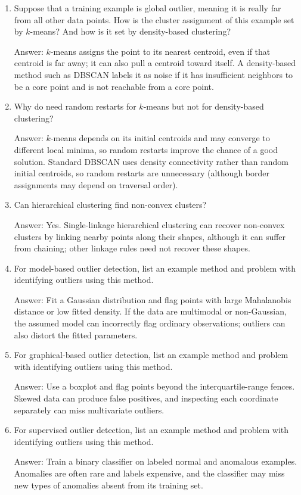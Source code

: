 \documentclass{article}
\newcommand{\gre}[1]{\textcolor{gre}{#1}}
\newcommand\ans[1]{\par\gre{Answer: #1}}
\begin{document}
\begin{enumerate}
\item Suppose that a training example is global outlier, meaning it is really far from all other data points. How is the cluster assignment of this example set by $k$-means? And how is it set by density-based clustering?
\ans{$k$-means assigns the point to its nearest centroid, even if that centroid is far away; it can also pull a centroid toward itself. A density-based method such as DBSCAN labels it as noise if it has insufficient neighbors to be a core point and is not reachable from a core point.}

\item Why do need random restarts for $k$-means but not for density-based clustering?
\ans{$k$-means depends on its initial centroids and may converge to different local minima, so random restarts improve the chance of a good solution. Standard DBSCAN uses density connectivity rather than random initial centroids, so random restarts are unnecessary (although border assignments may depend on traversal order).}

\item Can hierarchical clustering find non-convex clusters?
\ans{Yes. Single-linkage hierarchical clustering can recover non-convex clusters by linking nearby points along their shapes, although it can suffer from chaining; other linkage rules need not recover these shapes.}

\item For model-based outlier detection, list an example method and problem with identifying outliers using this method.
\ans{Fit a Gaussian distribution and flag points with large Mahalanobis distance or low fitted density. If the data are multimodal or non-Gaussian, the assumed model can incorrectly flag ordinary observations; outliers can also distort the fitted parameters.}

\item For graphical-based outlier detection, list an example method and problem with identifying outliers using this method.
\ans{Use a boxplot and flag points beyond the interquartile-range fences. Skewed data can produce false positives, and inspecting each coordinate separately can miss multivariate outliers.}

\item For supervised outlier detection, list an example method and problem with identifying outliers using this method.
\ans{Train a binary classifier on labeled normal and anomalous examples. Anomalies are often rare and labels expensive, and the classifier may miss new types of anomalies absent from its training set.}


\end{enumerate}
\end{document}
